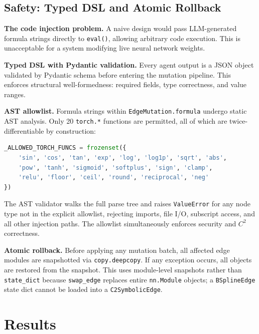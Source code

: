 \documentclass[11pt,a4paper]{article}
\begin{document}
\subsection{Safety: Typed DSL and Atomic Rollback}

\textbf{The code injection problem.} A naive design would pass LLM-generated formula
strings directly to \texttt{eval()}, allowing arbitrary code execution. This is
unacceptable for a system modifying live neural network weights.

\textbf{Typed DSL with Pydantic validation.} Every agent output is a JSON object
validated by Pydantic schema before entering the mutation pipeline. This enforces
structural well-formedness: required fields, type correctness, and value ranges.

\textbf{AST allowlist.} Formula strings within \texttt{EdgeMutation.formula} undergo
static AST analysis. Only 20 \texttt{torch.*} functions are permitted, all of which are
twice-differentiable by construction:

\begin{lstlisting}[language=Python]
_ALLOWED_TORCH_FUNCS = frozenset({
    'sin', 'cos', 'tan', 'exp', 'log', 'log1p', 'sqrt', 'abs',
    'pow', 'tanh', 'sigmoid', 'softplus', 'sign', 'clamp',
    'relu', 'floor', 'ceil', 'round', 'reciprocal', 'neg'
})
\end{lstlisting}

The AST validator walks the full parse tree and raises \texttt{ValueError} for any node
type not in the explicit allowlist, rejecting imports, file I/O, subscript access, and
all other injection paths. The allowlist simultaneously enforces security and $C^2$
correctness.

\textbf{Atomic rollback.} Before applying any mutation batch, all affected edge modules
are snapshotted via \texttt{copy.deepcopy}. If any exception occurs, all objects are
restored from the snapshot. This uses module-level snapshots rather than
\texttt{state\_dict} because \texttt{swap\_edge} replaces entire \texttt{nn.Module}
objects; a \texttt{BSplineEdge} state dict cannot be loaded into a
\texttt{C2SymbolicEdge}.

\section{Results}
\label{sec:results}
\end{document}
